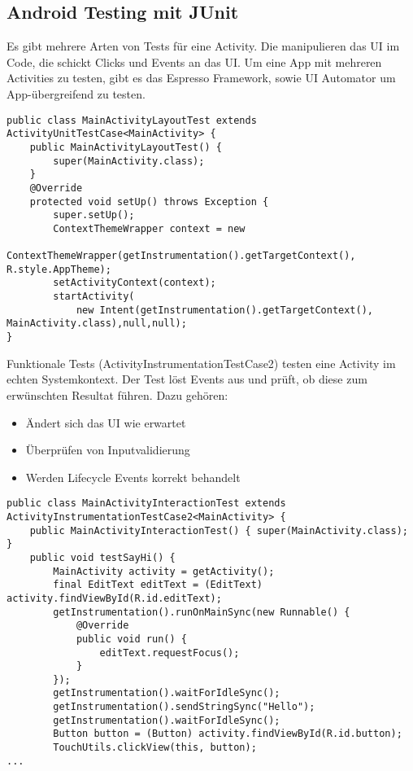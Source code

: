 \subsection{Android Testing mit JUnit}
Es gibt mehrere Arten von Tests für eine Activity. Die  manipulieren das UI im Code, die  schickt Clicks und Events an das UI. Um eine App mit mehreren Activities zu testen, gibt es das Espresso Framework, sowie UI Automator um App-übergreifend zu testen.
\begin{lstlisting}
public class MainActivityLayoutTest extends ActivityUnitTestCase<MainActivity> {
    public MainActivityLayoutTest() {
        super(MainActivity.class);
    }
    @Override
    protected void setUp() throws Exception {
        super.setUp();
        ContextThemeWrapper context = new
            ContextThemeWrapper(getInstrumentation().getTargetContext(), R.style.AppTheme);
        setActivityContext(context);
        startActivity(
            new Intent(getInstrumentation().getTargetContext(), MainActivity.class),null,null);
}
\end{lstlisting}
Funktionale Tests (ActivityInstrumentationTestCase2) testen eine Activity im echten Systemkontext. Der Test löst Events aus und prüft, ob diese zum erwünschten Resultat führen. Dazu gehören: 
\begin{itemize}
\item Ändert sich das UI wie erwartet
\item Überprüfen von Inputvalidierung
\item Werden Lifecycle Events korrekt behandelt
\end{itemize}
\begin{lstlisting}
public class MainActivityInteractionTest extends ActivityInstrumentationTestCase2<MainActivity> {
    public MainActivityInteractionTest() { super(MainActivity.class); }
    public void testSayHi() {
        MainActivity activity = getActivity();
        final EditText editText = (EditText) activity.findViewById(R.id.editText);
        getInstrumentation().runOnMainSync(new Runnable() {
            @Override
            public void run() {
                editText.requestFocus();
            }
        });
        getInstrumentation().waitForIdleSync();
        getInstrumentation().sendStringSync("Hello");
        getInstrumentation().waitForIdleSync();
        Button button = (Button) activity.findViewById(R.id.button);
        TouchUtils.clickView(this, button);
...
\end{lstlisting}
